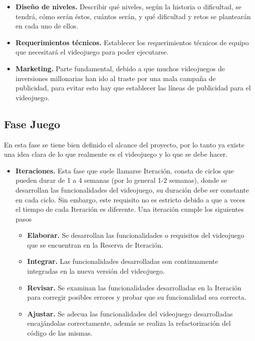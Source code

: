 \documentclass[a4paper, openright, 12pt]{report}
\begin{document}
\begin{itemize}
\item \textbf{Diseño de niveles.} Describir qué niveles, según la historia o dificultad, se tendrá, cómo serán éstos, cuántos serán, y qué dificultad y retos se plantearán en cada uno de ellos. \cite{Implementacion2011} 
\item \textbf{Requerimientos técnicos.} Establecer los requerimientos técnicos de equipo que necesitará el videojuego para poder ejecutarse. \cite{Implementacion2011}
\item \textbf{Marketing.} Parte fundamental, debido a que muchos videojuegos de inversiones millonarias han ido al traste por una mala campaña de publicidad, para evitar esto hay que establecer las líneas de publicidad para el videojuego. \cite{Implementacion2011}
\end{itemize}
\subsection*{Fase Juego}
\justify
En esta fase se tiene bien definido el alcance del proyecto, por lo tanto ya existe una idea clara de lo que realmente es el videojuego y lo que se debe hacer. \cite{Implementacion2011}
\begin{itemize}
\item \textbf{Iteraciones.} Esta fase que suele llamarse Iteración, consta de ciclos que pueden durar de 1 a 4 semanas (por lo general 1-2 semanas), donde se desarrollan las funcionalidades del videojuego, su duración debe ser constante en cada ciclo. Sin embargo, este requisito no es estricto debido a que a veces el tiempo de cada Iteración es diferente. Una iteración cumple los siguientes pasos \cite{Implementacion2011}
\begin{itemize}
\item \textbf{Elaborar.} Se desarrollan las funcionalidades o requisitos del videojuego que se encuentran en la Reserva de Iteración. \cite{Implementacion2011}
\item \textbf{Integrar.} Las funcionalidades desarrolladas son continuamente integradas en la nueva versión del videojuego. \cite{Implementacion2011}
\item \textbf{Revisar.} Se examinan las funcionalidades desarrolladas en la Iteración para corregir posibles errores y probar que su funcionalidad sea correcta. \cite{Implementacion2011}
\item \textbf{Ajustar.} Se adecua las funcionalidades del videojuego desarrolladas encajándolas correctamente, además se realiza la refactorización del código de las mismas. \cite{Implementacion2011}
\end{itemize}
\end{itemize}
\end{document}
